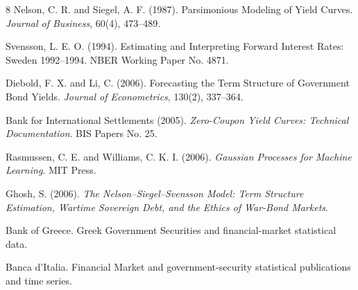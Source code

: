 \documentclass[a4paper,10pt]{article}
\theoremstyle{remark}
\begin{document}
\begin{thebibliography}{8}
 Nelson, C. R. and Siegel, A. F. (1987). Parsimonious Modeling of Yield Curves. \emph{Journal of Business}, 60(4), 473--489.

 Svensson, L. E. O. (1994). Estimating and Interpreting Forward Interest Rates: Sweden 1992--1994. NBER Working Paper No. 4871.

 Diebold, F. X. and Li, C. (2006). Forecasting the Term Structure of Government Bond Yields. \emph{Journal of Econometrics}, 130(2), 337--364.

 Bank for International Settlements (2005). \emph{Zero-Coupon Yield Curves: Technical Documentation}. BIS Papers No. 25.

 Rasmussen, C. E. and Williams, C. K. I. (2006). \emph{Gaussian Processes for Machine Learning}. MIT Press.

 Ghosh, S. (2006). \emph{The Nelson--Siegel--Svensson Model: Term Structure Estimation, Wartime Sovereign Debt, and the Ethics of War-Bond Markets}.

 Bank of Greece. Greek Government Securities and financial-market statistical data.

 Banca d'Italia. Financial Market and government-security statistical publications and time series.
\end{thebibliography}
\end{document}
